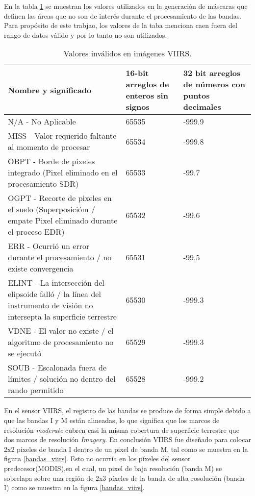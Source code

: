En la tabla \ref{invalid_values} se muestran los valores utilizados en la generación de máscaras que definen las áreas que no son de interés durante el procesamiento de las bandas. Para propósito de este trabjao, los valores de la taba menciona caen fuera del rango de datos válido y por lo tanto no son utilizados.  

\begin{table}[ht!]

\begin{center}
\begin{tabular}{| p{6cm} | p{2.5cm} | p{2.5cm} |}
\hline
Nombre y significado & 16-bit arreglos de enteros sin signos & 32 bit arreglos de números con puntos decimales \\
\hline
N/A - No Aplicable & 65535 & -999.9 \\
\hline
MISS - Valor requerido faltante al momento de procesar &  65534 & -999.8\\
\hline
OBPT - Borde de pixeles integrado (Pixel eliminado en el procesamiento SDR) & 65533 &-99.7\\
\hline
OGPT - Recorte de pixeles en el suelo (Superposicióm / empate Pixel eliminado durante el proceso EDR) & 65532 & -99.6 \\
\hline
ERR - Ocurrió un error durante el procesamiento / no existe convergencia & 65531 & -99.5 \\
\hline
ELINT - La intersección del elipsoide falló / la línea del instrumento de visión no intersepta la superficie terrestre & 65530 & -999.3 \\
\hline
VDNE - El valor no existe / el algoritmo de procesamiento no se ejecutó & 65529 & -999.3 \\
\hline
SOUB - Escalonada fuera de límites / solución no dentro del rando permitido & 65528 & -999.2 \\
\hline

\end{tabular}
\end{center}
\caption{Valores inválidos en imágenes VIIRS.} \label{invalid_values}

\end{table}


En el sensor VIIRS, el registro de las bandas se produce de forma simple debido a que las bandas I y M están alineadas, lo que significa que los marcos de resolución \textit{moderate} cubren casi la misma cobertura de superficie terrestre que dos marcos de resolución \textit{Imagery}. En conclusión VIIRS fue diseñado para colocar 2x2 pixeles de banda I dentro de un pixel de banda M, tal como se muestra en la figura \ref{bandas_viirs}. Esto no ocurría en los píxeles del sensor predecesor(MODIS),en el cual, un pixel de baja resolución (banda M) se sobrelapa sobre una región de 2x3 píxeles de la banda de alta rosolución (banda I) como se muestra en la figura \ref{bandas_viirs}.

